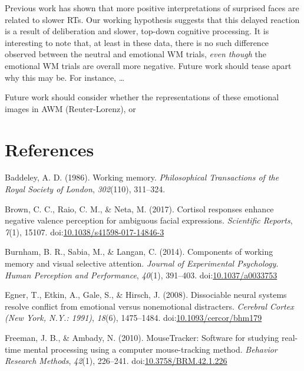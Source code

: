 \documentclass[man]{apa6}
\begin{document}
Previous work has shown that more positive interpretations of surprised faces are related to slower RTs. Our working hypothesis suggests that this delayed reaction is a result of deliberation and slower, top-down cognitive processing. It is interesting to note that, at least in these data, there is no such difference observed between the neutral and emotional WM trials, \emph{even though} the emotional WM trials are overall more negative. Future work should tease apart why this may be. For instance, \ldots{}

Future work should consider whether the representations of these emotional images in AWM (Reuter-Lorenz), or

\newpage

\hypertarget{references}{%
\section{References}\label{references}}

\begingroup
\setlength{\parindent}{-0.5in}
\setlength{\leftskip}{0.5in}

\hypertarget{refs}{}
\leavevmode\hypertarget{ref-baddeley_working_1986}{}%
Baddeley, A. D. (1986). Working memory. \emph{Philosophical Transactions of the Royal Society of London}, \emph{302}(110), 311--324.

\leavevmode\hypertarget{ref-brown_cortisol_2017}{}%
Brown, C. C., Raio, C. M., \& Neta, M. (2017). Cortisol responses enhance negative valence perception for ambiguous facial expressions. \emph{Scientific Reports}, \emph{7}(1), 15107. doi:\href{https://doi.org/10.1038/s41598-017-14846-3}{10.1038/s41598-017-14846-3}

\leavevmode\hypertarget{ref-burnham_components_2014}{}%
Burnham, B. R., Sabia, M., \& Langan, C. (2014). Components of working memory and visual selective attention. \emph{Journal of Experimental Psychology. Human Perception and Performance}, \emph{40}(1), 391--403. doi:\href{https://doi.org/10.1037/a0033753}{10.1037/a0033753}

\leavevmode\hypertarget{ref-egner_dissociable_2008}{}%
Egner, T., Etkin, A., Gale, S., \& Hirsch, J. (2008). Dissociable neural systems resolve conflict from emotional versus nonemotional distracters. \emph{Cerebral Cortex (New York, N.Y.: 1991)}, \emph{18}(6), 1475--1484. doi:\href{https://doi.org/10.1093/cercor/bhm179}{10.1093/cercor/bhm179}

\leavevmode\hypertarget{ref-freeman_mousetracker:_2010}{}%
Freeman, J. B., \& Ambady, N. (2010). MouseTracker: Software for studying real-time mental processing using a computer mouse-tracking method. \emph{Behavior Research Methods}, \emph{42}(1), 226--241. doi:\href{https://doi.org/10.3758/BRM.42.1.226}{10.3758/BRM.42.1.226}
\end{document}

